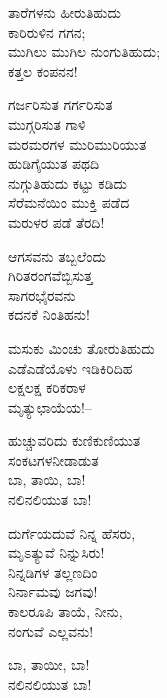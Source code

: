 \begin{myquote}
ತಾರೆಗಳನು ಹೀರುತಿಹುದು\\ಕಾರಿರುಳಿನ ಗಗನ;\\ಮುಗಿಲು ಮುಗಿಲ ನುಂಗುತಿಹುದು;\\ಕತ್ತಲ ಕಂಪನನ!
\end{myquote}

\begin{myquote}
ಗರ್ಜರಿಸುತ ಗರ್ಗರಿಸುತ\\ಮುಗ್ಗರಿಸುತ ಗಾಳಿ\\ಮರಮರಗಳ ಮುರಿಮುರಿಯುತ\\ಹುಡಿಗೈಯುತ ಪಥದಿ\\ನುಗ್ಗುತಿಹುದು ಕಟ್ಟು ಕಡಿದು\\ಸೆರೆಮನೆಯಿಂ ಮುಕ್ತಿ ಪಡೆದ\\ಮರುಳರ ಪಡೆ ತೆರದಿ!
\end{myquote}

\begin{myquote}
ಆಗಸವನು ತಬ್ಬಲೆಂದು\\ಗಿರಿತರಂಗವೆಬ್ಬಿಸುತ್ತ\\ಸಾಗರಭೈರವನು\\ಕದನಕೆ ನಿಂತಿಹನು!
\end{myquote}

\begin{myquote}
ಮಸುಕು ಮಿಂಚು ತೋರುತಿಹುದು\\ಎಡೆಎಡೆಯೊಳು ಇಡಿಕಿರಿದಿಹ\\ಲಕ್ಷಲಕ್ಷ ಕರಿಕರಾಳ\\ಮೃತ್ಯುಛಾಯೆಯ!–
\end{myquote}

\begin{myquote}
ಹುಚ್ಚುವರಿದು ಕುಣಿಕುಣಿಯುತ\\ಸಂಕಟಗಳನೀಡಾಡುತ\\ಬಾ, ತಾಯಿ, ಬಾ!\\ನಲಿನಲಿಯುತ ಬಾ!
\end{myquote}

\begin{myquote}
ದುರ್ಗೆಯದುವೆ ನಿನ್ನ ಹೆಸರು,\\ಮೃಽತ್ಯುವೆ ನಿನ್ನುಸಿರು!\\ನಿನ್ನಡಿಗಳ ತಲ್ಲಣದಿಂ\\ನಿರ್ನಾಮವು ಜಗವು!\\ಕಾಲರೂಪಿ ತಾಯೆ, ನೀನು,\\ನಂಗುವೆ ಎಲ್ಲವನು!
\end{myquote}

\begin{myquote}
ಬಾ, ತಾಯೀ, ಬಾ!\\ನಲಿನಲಿಯುತ ಬಾ!
\end{myquote}

